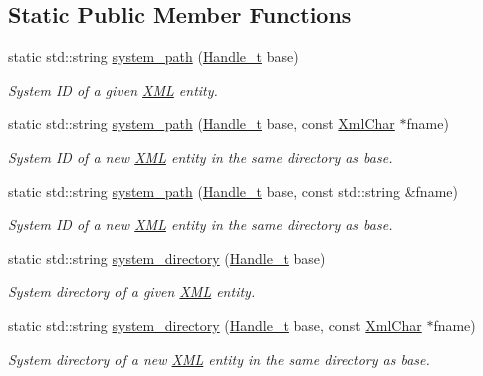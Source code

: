 \subsection*{Static Public Member Functions}
\begin{DoxyCompactItemize}
\item 
static std\+::string \hyperlink{class_d_d4hep_1_1_x_m_l_1_1_document_handler_a606d6b73c50047ecdb1df4c69be320f6}{system\+\_\+path} (\hyperlink{class_d_d4hep_1_1_x_m_l_1_1_handle__t}{Handle\+\_\+t} base)
\begin{DoxyCompactList}\small\item\em System ID of a given \hyperlink{namespace_d_d4hep_1_1_x_m_l}{X\+ML} entity. \end{DoxyCompactList}\item 
static std\+::string \hyperlink{class_d_d4hep_1_1_x_m_l_1_1_document_handler_a6cc1864ffc55f0a9168f5238ea5c06fd}{system\+\_\+path} (\hyperlink{class_d_d4hep_1_1_x_m_l_1_1_handle__t}{Handle\+\_\+t} base, const \hyperlink{namespace_d_d4hep_1_1_x_m_l_a09e5d9cc86ed782f6826dfe0778c1815}{Xml\+Char} $\ast$fname)
\begin{DoxyCompactList}\small\item\em System ID of a new \hyperlink{namespace_d_d4hep_1_1_x_m_l}{X\+ML} entity in the same directory as base. \end{DoxyCompactList}\item 
static std\+::string \hyperlink{class_d_d4hep_1_1_x_m_l_1_1_document_handler_a1b297ff3de62b00132c1034560c65886}{system\+\_\+path} (\hyperlink{class_d_d4hep_1_1_x_m_l_1_1_handle__t}{Handle\+\_\+t} base, const std\+::string \&fname)
\begin{DoxyCompactList}\small\item\em System ID of a new \hyperlink{namespace_d_d4hep_1_1_x_m_l}{X\+ML} entity in the same directory as base. \end{DoxyCompactList}\item 
static std\+::string \hyperlink{class_d_d4hep_1_1_x_m_l_1_1_document_handler_aac81a43d656b9c4149d6e40642abf0fb}{system\+\_\+directory} (\hyperlink{class_d_d4hep_1_1_x_m_l_1_1_handle__t}{Handle\+\_\+t} base)
\begin{DoxyCompactList}\small\item\em System directory of a given \hyperlink{namespace_d_d4hep_1_1_x_m_l}{X\+ML} entity. \end{DoxyCompactList}\item 
static std\+::string \hyperlink{class_d_d4hep_1_1_x_m_l_1_1_document_handler_afcb87f1aa5a2dbd771990d4e2e36a3ed}{system\+\_\+directory} (\hyperlink{class_d_d4hep_1_1_x_m_l_1_1_handle__t}{Handle\+\_\+t} base, const \hyperlink{namespace_d_d4hep_1_1_x_m_l_a09e5d9cc86ed782f6826dfe0778c1815}{Xml\+Char} $\ast$fname)
\begin{DoxyCompactList}\small\item\em System directory of a new \hyperlink{namespace_d_d4hep_1_1_x_m_l}{X\+ML} entity in the same directory as base. \end{DoxyCompactList}\end{DoxyCompactItemize}


